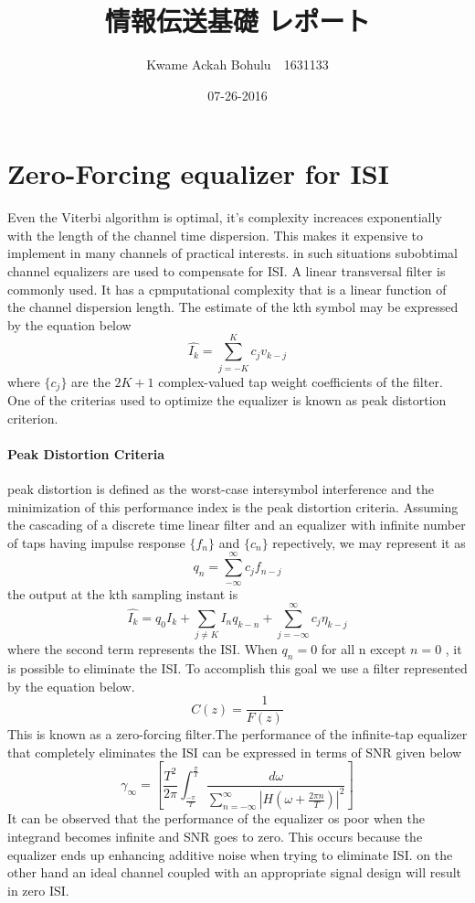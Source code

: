 \documentclass[24 pts]{article}
\title{情報伝送基礎 レポート}
\date{07-26-2016}
\author{Kwame Ackah Bohulu　1631133}
\begin{document}
\maketitle
\section{Zero-Forcing equalizer for ISI}
Even the Viterbi algorithm is optimal, it's complexity increaces exponentially with the length of the channel time dispersion. This makes it expensive to implement in many channels of practical interests. in such situations subobtimal channel equalizers are used to compensate for ISI. A linear transversal filter is commonly used. It has a cpmputational complexity that is a linear function of the channel dispersion length.
The estimate of the kth symbol may be expressed by the equation below
\begin{equation}
\hat{I_k}= \sum_{j=-K}^K c_jv_{k-j}
\end{equation}
where $\{ c_j\}$ are the $2K+1$ complex-valued tap weight coefficients of the filter. One of the criterias used to optimize the equalizer is known as peak distortion criterion.
\paragraph{Peak Distortion Criteria}
peak distortion is defined as the worst-case intersymbol interference and the minimization of this performance index is the peak distortion criteria. Assuming the cascading of a discrete time linear filter and an equalizer with infinite number of taps having impulse response $\{ f_n\}$ and $\{ c_n\}$ repectively, we may represent it as 
\begin{equation}
q_n= \sum_{-\infty}^\infty c_jf_{n-j}
\end{equation}
the output at the kth sampling instant is
\begin{equation}
\hat{I_k}= q_0I_k+\sum_{j\neq K}I_nq_{k-n}+ \sum_{j=-\infty}^\infty c_j\eta_{k-j}
\end{equation}
where the second term represents the ISI. When $q_n =0$ for all n except $n=0$ , it is possible to eliminate the ISI. To accomplish this goal we use a filter represented by the equation below.
\begin{equation}
C(z)=\frac{1}{F(z)}
\end{equation}
This is known as a zero-forcing filter.The performance of the infinite-tap equalizer that completely eliminates the ISI can be expressed in terms of SNR given below
\begin{equation}
\gamma_\infty=\left [\frac{T^2}{2\pi}\int_{\frac{-\pi}{T}}^{\frac{\pi}{T}} \frac{d\omega}{\sum_{n=-\infty}^{\infty}|H(\omega + \frac{2\pi n}{T})|^2}\right]
\end{equation}
It can be observed that the performance of the equalizer os poor when the integrand becomes infinite and SNR goes to zero. This occurs because the equalizer ends up enhancing additive noise when trying to eliminate ISI. on the other hand an ideal channel coupled with an appropriate signal design will result in zero ISI.
\end{document}
